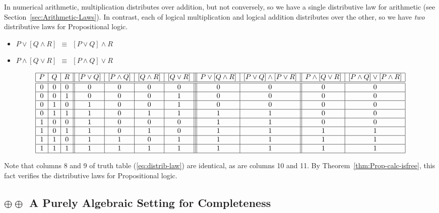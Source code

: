 \smallskip

\noindent
In numerical arithmetic, multiplication distributes over addition, but not conversely, so we have a single distributive law for arithmetic (see Section~\ref{sec:Arithmetic-Laws}).  In contrast, each of logical multiplication and logical addition distributes over the other, so we have {\em two} distributive laws for Propositional logic.
\begin{itemize}
\item
$ P \vee [ Q \wedge R] \ \ \equiv \ \ [P \vee Q] \wedge R$
\item
$P \wedge [ Q \vee R] \ \ \equiv \ \ [P \wedge Q] \vee R$
\end{itemize}
{\small
\begin{equation}
\label{eq:distrib-law}
\begin{array}{|c|c|c||c|c|c|c|||c|c||c|c|}
\hline
P & Q & R
  & [P \vee Q]
  & [P \wedge Q]
  & [Q \wedge R] 
  & [Q \vee R] 
  & P \vee [ Q \wedge R]
  & [P \vee Q] \wedge [P \vee R]
  & P \wedge [ Q \vee R]
  & [P \wedge Q] \vee [P \wedge R] \\
\hline
\hline
0 & 0 & 0
  & 0
  & 0
  & 0
  & 0
  & 0
  & 0
  & 0
  & 0 \\ 
\hline
0 & 0 & 1
  & 0
  & 0
  & 0
  & 1
  & 0
  & 0
  & 0 
  & 0 \\
\hline
0 & 1 & 0
  & 1
  & 0
  & 0
  & 1
  & 0
  & 0
  & 0
  & 0 \\
\hline
0 & 1 & 1
  & 1
  & 0
  & 1
  & 1
  & 1
  & 1
  & 0
  & 0 \\
\hline
1 & 0 & 0
  & 1
  & 0
  & 0
  & 0
  & 1
  & 1
  & 0
  & 0 \\
\hline
1 & 0 & 1
  & 1
  & 0
  & 1
  & 0
  & 1
  & 1
  & 1
  & 1 \\
\hline
1 & 1 & 0
  & 1
  & 1
  & 0
  & 1
  & 1
  & 1
  & 1
  & 1 \\
\hline
1 & 1 & 1
  & 1
  & 1
  & 1
  & 1
  & 1
  & 1
  & 1
  & 1 \\
\hline
\end{array}
\end{equation}
}

Note that columns 8 and 9 of truth table (\ref{eq:distrib-law}) are identical, as are columns 10 and 11.  By Theorem~\ref{thm:Prop-calc-isfree}, this fact verifies the distributive laws for Propositional logic.


\subsection{$\oplus \oplus$ A Purely Algebraic Setting for Completeness}

